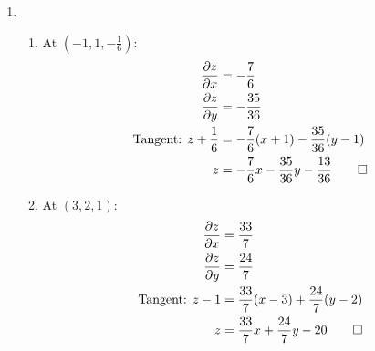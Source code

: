 \documentclass[12pt, a4paper]{article}
\begin{document}
\begin{enumerate}[Q\arabic*.]
  \item 
    \begin{enumerate}[(\alph*)]
      \item At $\displaystyle (-1,1,-\frac{1}{6})$: 
        \begin{align*}
          \frac{\partial z}{\partial x} &= -\frac{7}{6}\\
          \frac{\partial z}{\partial y} &= -\frac{35}{36}\\
          \text{Tangent: }z+\frac{1}{6} &= -\frac{7}{6}(x+1) - \frac{35}{36}(y-1)\\
          z &= -\frac{7}{6}x -\frac{35}{36}y-\frac{13}{36}\qed
        \end{align*}
      \item At $(3, 2, 1)$:
        \begin{align*}
          \frac{\partial z}{\partial x} &= \frac{33}{7}\\
          \frac{\partial z}{\partial y} &= \frac{24}{7}\\
          \text{Tangent: }z-1 &= \frac{33}{7}(x-3) + \frac{24}{7}(y-2)\\
           z &= \frac{33}{7}x + \frac{24}{7}y - 20 \qed
        \end{align*}
    \end{enumerate}
\end{enumerate}
\end{document}
